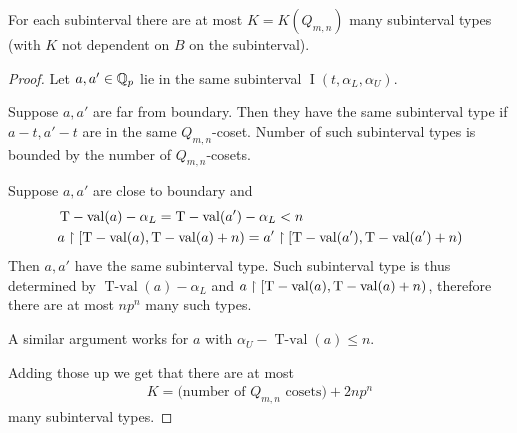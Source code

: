 \documentclass{amsart}
\DeclareMathOperator{\tval}{T-val}
\DeclareMathOperator{\inti}{I}
\newcommand{\interval}{\inti(t, \alpha_L, \alpha_U)}
\begin{document}
\begin{Lemma} \label{interval_type_count}
  For each subinterval there are at most $K = K(Q_{m,n})$ many subinterval types 
  (with $K$ not dependent on $B$ on the subinterval).  
\end{Lemma}

\begin{proof}
  Let $a, a' \in \mathbb{Q}_p$ lie in the same subinterval $\interval$.

  Suppose $a, a'$ are far from boundary.
  Then they have the same subinterval type if $a - t, a' - t$ are in the same $Q_{m,n}$-coset.
  Number of such subinterval types is bounded by the number of $Q_{m,n}$-cosets.

  Suppose $a, a'$ are close to boundary and
  \begin{align*}
    &\tval(a) - \alpha_L = \tval(a') - \alpha_L < n \\
    &a \midr [\tval(a), \tval(a) + n) = a' \midr [\tval(a'), \tval(a') + n)  
  \end{align*}
  Then $a, a'$ have the same subinterval type.
  Such subinterval type is thus determined by $\tval(a) - \alpha_L$ and $a \midr [\tval(a), \tval(a) + n)$,
  therefore there are at most $n p^n$ many such types.

  A similar argument works for $a$ with $\alpha_U - \tval(a) \leq n$.

  Adding those up we get that there are at most
  \begin{align*}
    K = \text{(number of $Q_{m,n}$ cosets)} + 2 n p^n  
  \end{align*}
  many subinterval types.
\end{proof}
\end{document}

